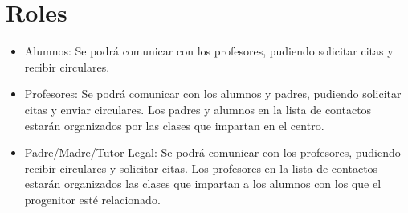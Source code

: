 	\section{Roles}
		\begin{itemize}
			\item Alumnos: Se podrá comunicar con los profesores, pudiendo solicitar citas y recibir circulares.
			\item Profesores: Se podrá comunicar con los alumnos y padres, pudiendo solicitar citas y enviar circulares. Los padres y alumnos en la lista de contactos estarán organizados por las clases que impartan en el centro.
			\item Padre/Madre/Tutor Legal: Se podrá comunicar con los profesores, pudiendo recibir circulares y solicitar citas. Los profesores en la lista de contactos estarán organizados las clases que impartan a los alumnos con los que el progenitor esté relacionado.
		\end{itemize}
